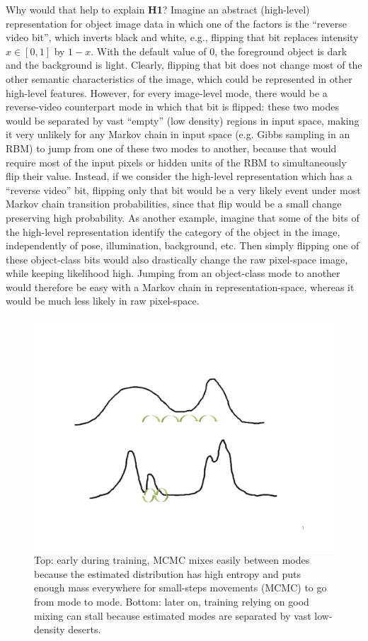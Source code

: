 Why would that help to explain {\bf H1}? Imagine an abstract (high-level)
representation for object image data in which one of the factors is the
``reverse video bit'', which inverts black and white, e.g., flipping that
bit replaces intensity $x \in [0,1]$ by $1-x$. With the default value of 0,
the foreground object is dark and the background is light.  Clearly, flipping
that bit does not change most of the other semantic characteristics of the
image, which could be represented in other high-level features. However,
for every image-level mode, there would be a reverse-video counterpart mode
in which that bit is flipped: these two modes would be separated by
vast ``empty'' (low density) regions in input space, making it very
unlikely for any Markov chain in input space (e.g. Gibbs sampling in an
RBM) to jump from one of these two modes to another, because that would require
most of the input pixels or hidden units of the RBM to simultaneously
flip their value. Instead, if we consider the high-level representation 
which has a ``reverse video''
bit, flipping only that bit would be a very likely event 
under most Markov chain transition probabilities,
since that flip would be a small change preserving high probability.
As another example, imagine that some of the bits of the high-level
representation identify the category of the object in the image, independently of pose,
illumination, background, etc. Then simply flipping one of these
object-class bits would also drastically change the raw pixel-space image,
while keeping likelihood high. Jumping from an object-class mode to another
would therefore be easy with a Markov chain in representation-space, 
whereas it would be much less likely in raw pixel-space.

\begin{figure}[!hbpt]
\centerline{\includegraphics[width=0.75\linewidth]{article3/images/mixing-problem.pdf}}
\caption{\small Top: early during training, MCMC mixes easily between modes because the estimated
distribution has high entropy and puts enough mass everywhere for small-steps
movements (MCMC) to go from mode to mode. Bottom: later on, training relying
on good mixing can stall because estimated modes are separated by vast
low-density deserts.} \label{fig:mixing-issue}
\end{figure}


